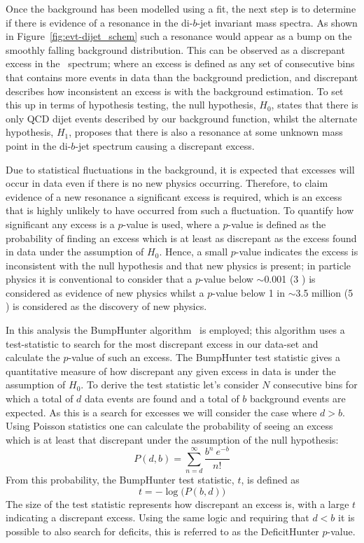 Once the background has been modelled using a fit, the next step is to determine
if there is evidence of a resonance in the di-$b$-jet invariant mass spectra.
As shown in Figure~\ref{fig:evt-dijet_schem} such a resonance would appear as a bump on the smoothly falling background distribution.
This can be observed as a discrepant excess in the~\mjj{} spectrum;
where an excess is defined as any set of consecutive bins that contains
more events in data than the background prediction,
and discrepant describes how inconsistent an excess is with the background estimation.
To set this up in terms of hypothesis testing, the null hypothesis, $H_0$,
states that there is only QCD dijet events described by our background function,
whilst the alternate hypothesis, $H_1$, proposes that there is also a resonance at some
unknown mass point in the di-$b$-jet spectrum causing a discrepant excess.

Due to statistical fluctuations in the background,
it is expected that excesses will occur in data even if there is no new physics occurring.
Therefore, to claim evidence of a new resonance a significant excess is required,
which is an excess that is highly unlikely to have occurred from such a fluctuation.
To quantify how significant any excess is a $p$-value is used,
where a $p$-value is defined as the probability of finding an excess which is at least as discrepant as the excess found in data
under the assumption of $H_0$.
Hence, a small $p$-value indicates the excess is inconsistent with the null hypothesis and that new physics is present;
in particle physics it is conventional to consider that a $p$-value below $\sim$0.001 (3 \sigma) is considered as evidence of new physics
whilst a $p$-value below 1 in $\sim$3.5 million (5 \sigma) is considered as the discovery of new physics.

In this analysis the {\sc BumpHunter} algorithm~\cite{dibjet-bh} is employed;
this algorithm uses a test-statistic to 
search for the most discrepant excess in our data-set
and calculate the $p$-value of such an excess.
The BumpHunter test statistic gives a quantitative measure of how discrepant any given excess in data is
under the assumption of $H_0$.
To derive the test statistic let's consider $N$ consecutive bins for which
a total of $d$ data events are found and a total of $b$ background events are expected.
As this is a search for excesses we will consider the case where $d > b$.
Using Poisson statistics one can calculate the probability of seeing an excess which is at least that discrepant
under the assumption of the null hypothesis:
\begin{equation}
  P(d,b) = \sum_{n=d}^{\infty} \frac{b^n~e^{-b}}{n!}
\end{equation}
From this probability, the BumpHunter test statistic, $t$, is defined as
\begin{equation}
 t = -\log{\big(P(b,d)\big)}
\end{equation}
The size of the test statistic represents how discrepant an excess is,
with a large $t$ indicating a discrepant excess.
Using the same logic and requiring that $d < b$ it is possible to also search for deficits,
this is referred to as the DeficitHunter $p$-value.

